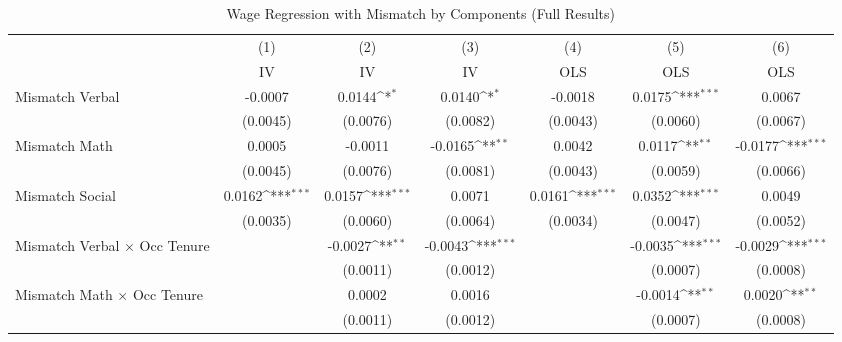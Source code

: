 {
\def\sym#1{\ifmmode^{#1}\else\(^{#1}\)\fi}
\begin{longtable}{l*{6}{c}}
\caption{Wage Regression with Mismatch by Components (Full Results)}\\
\hline  \endfirsthead\hline  \endhead\hline  \endfoot\endlastfoot
                    &\multicolumn{1}{c}{(1)}&\multicolumn{1}{c}{(2)}&\multicolumn{1}{c}{(3)}&\multicolumn{1}{c}{(4)}&\multicolumn{1}{c}{(5)}&\multicolumn{1}{c}{(6)}\\
                    &\multicolumn{1}{c}{IV}&\multicolumn{1}{c}{IV}&\multicolumn{1}{c}{IV}&\multicolumn{1}{c}{OLS}&\multicolumn{1}{c}{OLS}&\multicolumn{1}{c}{OLS}\\
\hline  
Mismatch Verbal     &     -0.0007         &      0.0144\sym{*}  &      0.0140\sym{*}  &     -0.0018         &      0.0175\sym{***}&      0.0067         \\
                    &    (0.0045)         &    (0.0076)         &    (0.0082)         &    (0.0043)         &    (0.0060)         &    (0.0067)         \\
Mismatch Math       &      0.0005         &     -0.0011         &     -0.0165\sym{**} &      0.0042         &      0.0117\sym{**} &     -0.0177\sym{***}\\
                    &    (0.0045)         &    (0.0076)         &    (0.0081)         &    (0.0043)         &    (0.0059)         &    (0.0066)         \\
Mismatch Social     &      0.0162\sym{***}&      0.0157\sym{***}&      0.0071         &      0.0161\sym{***}&      0.0352\sym{***}&      0.0049         \\
                    &    (0.0035)         &    (0.0060)         &    (0.0064)         &    (0.0034)         &    (0.0047)         &    (0.0052)         \\
Mismatch Verbal $\times$ Occ Tenure&                     &     -0.0027\sym{**} &     -0.0043\sym{***}&                     &     -0.0035\sym{***}&     -0.0029\sym{***}\\
                    &                     &    (0.0011)         &    (0.0012)         &                     &    (0.0007)         &    (0.0008)         \\
Mismatch Math $\times$ Occ Tenure&                     &      0.0002         &      0.0016         &                     &     -0.0014\sym{**} &      0.0020\sym{**} \\
                    &                     &    (0.0011)         &    (0.0012)         &                     &    (0.0007)         &    (0.0008)         \\

\end{longtable}}
